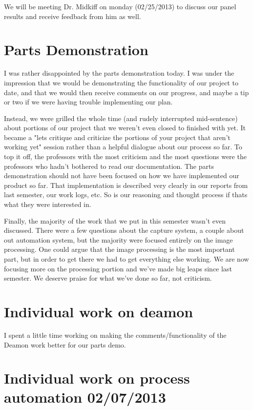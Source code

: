 \documentclass[]{article}
\begin{document}
	We will be meeting Dr. Midkiff on monday (02/25/2013) to discuss our panel results and receive feedback from him as well.
	
	\section{Parts Demonstration}
	
	I was rather disappointed by the parts demonstration today. I was under the impression that we would be demonstrating the functionality of our project to date, and that we would then receive comments on our progress, and maybe a tip or two if we were having trouble implementing our plan.
	
	Instead, we were grilled the whole time (and rudely interrupted mid-sentence) about portions of our project that we weren't even closed to finished with yet. It became a "lets critique and criticize the portions of your project that aren't working yet" session rather than a helpful dialogue about our process so far. To top it off, the professors with the most criticism and the most questions were the professors who hadn't bothered to read our documentation. The parts demonstration should not have been focused on how we have implemented our product so far. That implementation is described very clearly in our reports from last semester, our work logs, etc. So is our reasoning and thought process if thats what they were interested in.
	
	Finally, the majority of the work that we put in  this semester wasn't even discussed. There were a few questions about the capture system, a couple about out automation system, but the majority were focused entirely on the image processing. One could argue that the image processing is the most important part, but in order to get there we had to get everything else working. We are now focusing more on the processing portion and we've made big leaps since last semester. We deserve praise for what we've done so far, not criticism.
	
	\section{Individual work on deamon}
	
	I spent a little time working on making the comments/functionality of the Deamon work better for our parts demo. 
	
	\section{Individual work on process automation 02/07/2013}
	
\end{document}
